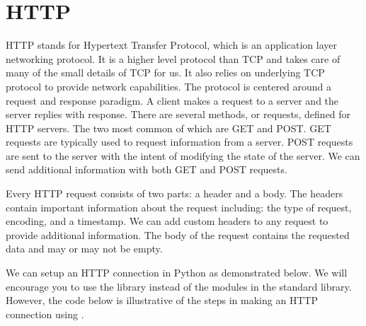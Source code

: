 \begin{comment}
While we would normally think of communication between sockets on different machines, two sockets on the same machine can communicate via TCP as well.
We give an example of the latter, for simplicity.





We can start understanding the code above by seeing that a TCP connection is a link between two sockets.
Those sockets can be on the same machine (as in the case above), or different machines.
The machines are uniquely identified by an IP address.
The IP address used in our example is a special IP address that always refers the local machine.
Every computer has the ip 127.0.0.1.
\end{comment}

\section*{HTTP} %

HTTP stands for Hypertext Transfer Protocol, which is an application layer networking protocol.
It is a higher level protocol than TCP and takes care of many of the small details of TCP for us.
It also relies on underlying TCP protocol to provide network capabilities.
The protocol is centered around a request and response paradigm.
A client makes a request to a server and the server replies with response.
There are several methods, or requests, defined for HTTP servers. The two most common of which are GET and POST.
GET requests are typically used to request information from a server.
POST requests are sent to the server with the intent of modifying the state of the server.
We can send additional information with both GET and POST requests.

Every HTTP request consists of two parts: a header and a body.
The headers contain important information about the request including: the type of request, encoding, and a timestamp.
We can add custom headers to any request to provide additional information.
The body of the request contains the requested data and may or may not be empty.

We can setup an HTTP connection in Python as demonstrated below.
We will encourage you to use the  library instead of the modules in the standard library.
However, the code below is illustrative of the steps in making an HTTP connection using .

